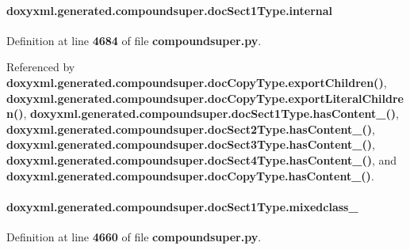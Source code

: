 \paragraph[{internal}]{\setlength{\rightskip}{0pt plus 5cm}doxyxml.\+generated.\+compoundsuper.\+doc\+Sect1\+Type.\+internal}\label{classdoxyxml_1_1generated_1_1compoundsuper_1_1docSect1Type_afb1dcf967015aa06796b9e99de45071c}


Definition at line {\bf 4684} of file {\bf compoundsuper.\+py}.



Referenced by {\bf doxyxml.\+generated.\+compoundsuper.\+doc\+Copy\+Type.\+export\+Children()}, {\bf doxyxml.\+generated.\+compoundsuper.\+doc\+Copy\+Type.\+export\+Literal\+Children()}, {\bf doxyxml.\+generated.\+compoundsuper.\+doc\+Sect1\+Type.\+has\+Content\+\_\+()}, {\bf doxyxml.\+generated.\+compoundsuper.\+doc\+Sect2\+Type.\+has\+Content\+\_\+()}, {\bf doxyxml.\+generated.\+compoundsuper.\+doc\+Sect3\+Type.\+has\+Content\+\_\+()}, {\bf doxyxml.\+generated.\+compoundsuper.\+doc\+Sect4\+Type.\+has\+Content\+\_\+()}, and {\bf doxyxml.\+generated.\+compoundsuper.\+doc\+Copy\+Type.\+has\+Content\+\_\+()}.

\paragraph[{mixedclass\+\_\+}]{\setlength{\rightskip}{0pt plus 5cm}doxyxml.\+generated.\+compoundsuper.\+doc\+Sect1\+Type.\+mixedclass\+\_\+}\label{classdoxyxml_1_1generated_1_1compoundsuper_1_1docSect1Type_a8c96a7ea58c886e3c7c02248f65473a2}


Definition at line {\bf 4660} of file {\bf compoundsuper.\+py}.



